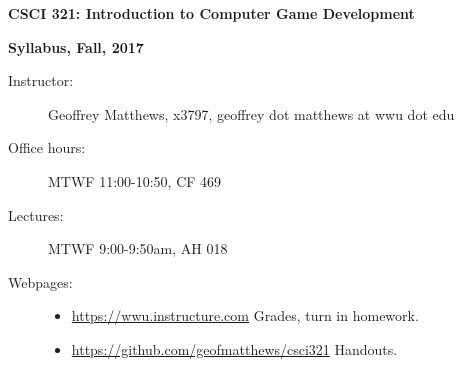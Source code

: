 \documentclass{article}
\begin{document}
\centerline{\Large \bf CSCI 321: Introduction to Computer Game Development}

\centerline{\bf Syllabus, Fall, 2017}

\begin{description}

\item[Instructor:] Geoffrey Matthews, x3797,
 geoffrey dot matthews at wwu dot edu

\item[Office hours:] MTWF 11:00-10:50, CF 469

\item[Lectures:] MTWF 9:00-9:50am, AH 018


\item [Webpages:] \mbox{}\begin{itemize}
\item\url{https://wwu.instructure.com} Grades, turn in homework.
\item\url{https://github.com/geofmatthews/csci321} Handouts.
\end{itemize}



\end{description}
\end{document}
